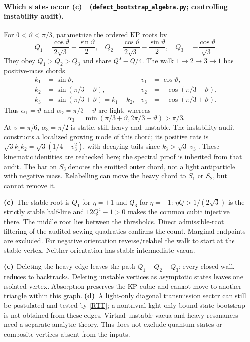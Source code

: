 \documentclass[11pt,a4paper]{article}
\newcommand{\C}{\textbf{(c)}\ }
\newcommand{\D}{\textbf{(d)}\ }
\newcommand{\file}[1]{\nolinkurl{#1}}
\newcommand{\alg}{\file{defect_bootstrap_algebra.py}}
\begin{document}
\paragraph{Which states occur \C\ (\alg; controlling instability audit).}
For $0<\vartheta<\pi/3$, parametrize the ordered KP roots by
\begin{equation}
 Q_1=\frac{\cos\vartheta}{2\sqrt3}+\frac{\sin\vartheta}{2},\quad
 Q_2=\frac{\cos\vartheta}{2\sqrt3}-\frac{\sin\vartheta}{2},\quad
 Q_3=-\frac{\cos\vartheta}{\sqrt3}.\label{roots}
\end{equation}
They obey $Q_1>Q_2>Q_3$ and share $Q^3-Q/4$.
The walk $1\to2\to3\to1$ has positive-mass chords
\begin{align}
 k_1&=\sin\vartheta,&v_1&=\cos\vartheta,\nonumber\\
 k_2&=\sin(\pi/3-\vartheta),&v_2&=-\cos(\pi/3-\vartheta),\nonumber\\
 k_3&=\sin(\pi/3+\vartheta)=k_1+k_2,&
 v_3&=-\cos(\pi/3+\vartheta).\label{chords}
\end{align}
Thus $\alpha_1=\vartheta$ and $\alpha_2=\pi/3-\vartheta$ are light, whereas
\begin{equation}
 \alpha_3=\min(\pi/3+\vartheta,2\pi/3-\vartheta)>\pi/3.\label{heavy}
\end{equation}
At $\vartheta=\pi/6$, $\alpha_3=\pi/2$ is static, still heavy and unstable.
The instability audit constructs a localized growing mode of this chord;
its positive rate is $\sqrt3k_1k_2=\sqrt3(1/4-v_3^2)$, with decaying tails
since $k_3>\sqrt3|v_3|$. These kinematic identities are rechecked here; the
spectral proof is inherited from that audit. The bar on $\bar S_3$ denotes
the emitted outer chord, not a light antiparticle with negative mass.
Relabelling can move the heavy chord to $S_1$ or $S_2$, but cannot remove it.

\C The stable root is $Q_1$ for $\eta=+1$ and $Q_3$ for $\eta=-1$:
$\eta Q>1/(2\sqrt3)$ is the strictly stable half-line and $12Q^2-1>0$
makes the common cubic injective there. The middle root lies between the
thresholds. Direct admissible-root filtering of the audited sewing quadratics
confirms the count. Marginal endpoints are excluded. For negative orientation
reverse/relabel the walk to start at the stable vertex. Neither orientation
has stable intermediate vacua.

\C Deleting the heavy edge leaves the path $Q_1-Q_2-Q_3$: every closed walk
reduces to backtracks. Deleting unstable vertices as asymptotic states leaves
one isolated vertex. Absorption preserves the KP cubic and cannot move to
another triangle within this graph. \D A light-only diagonal transmission
sector can still be postulated and tested by \eqref{RTT}; a nontrivial
light-only bound-state bootstrap is not obtained from these edges. Virtual
unstable vacua and heavy resonances need a separate analytic theory. This
does not exclude quantum states or composite vertices absent from the inputs.
\end{document}
